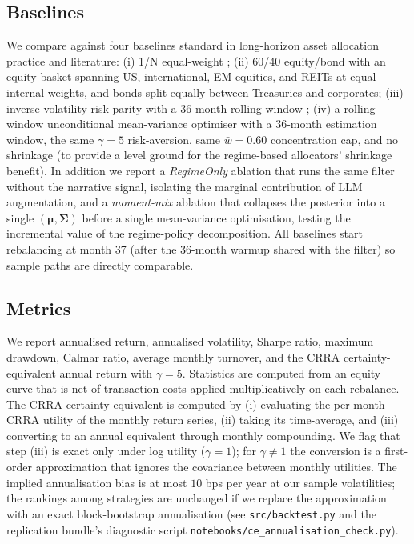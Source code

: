 \documentclass[review,12pt,authoryear]{elsarticle}
\begin{document}
\subsection{Baselines}
We compare against four baselines standard in long-horizon asset allocation practice and
literature: (i) 1/N equal-weight \citep{DeMiguel2009}; (ii) 60/40 equity/bond with an
equity basket spanning US, international, EM equities, and REITs at equal internal
weights, and bonds split equally between Treasuries and corporates;
(iii) inverse-volatility risk parity with a 36-month rolling window
\citep{MaillardRoncalli2010}; (iv) a rolling-window unconditional mean-variance
optimiser with a 36-month estimation window, the same $\gamma=5$ risk-aversion, same
$\bar{w}=0.60$ concentration cap, and no shrinkage (to provide a level ground for the
regime-based allocators' shrinkage benefit). In addition we report a \emph{RegimeOnly}
ablation that runs the same filter without the narrative signal, isolating the marginal
contribution of LLM augmentation, and a \emph{moment-mix} ablation that collapses the
posterior into a single $(\boldsymbol{\mu},\boldsymbol{\Sigma})$ before a single
mean-variance optimisation, testing the incremental value of the regime-policy
decomposition. All baselines start rebalancing at month 37 (after the 36-month warmup
shared with the filter) so sample paths are directly comparable.

\subsection{Metrics}
We report annualised return, annualised volatility, Sharpe ratio, maximum drawdown,
Calmar ratio, average monthly turnover, and the CRRA certainty-equivalent annual return
with $\gamma=5$. Statistics are computed from an equity curve that is net of transaction
costs applied multiplicatively on each rebalance. The CRRA certainty-equivalent is
computed by (i) evaluating the per-month CRRA utility of the monthly return series,
(ii) taking its time-average, and (iii) converting to an annual equivalent through
monthly compounding. We flag that step (iii) is exact only under log utility
($\gamma=1$); for $\gamma \ne 1$ the conversion is a first-order approximation that
ignores the covariance between monthly utilities. The implied annualisation bias is at
most $10$ bps per year at our sample volatilities; the rankings among strategies are
unchanged if we replace the approximation with an exact block-bootstrap annualisation
(see \texttt{src/backtest.py} and the replication bundle's diagnostic script
\texttt{notebooks/ce\_annualisation\_check.py}).
\end{document}
